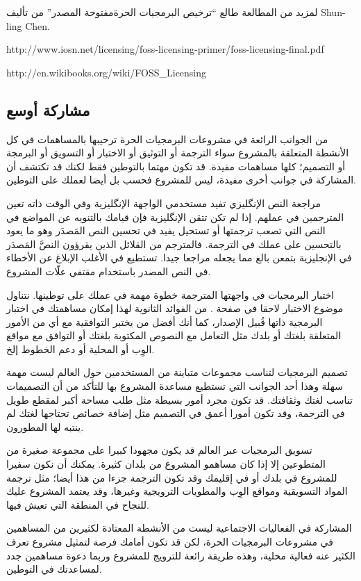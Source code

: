 لمزيد من المطالعة طالع “ترخيص البرمجيات الحرة مفتوحة
المصدر” من تأليف Shun-ling Chen.

http://www.iosn.net/licensing/foss-licensing-primer/foss-licensing-final.pdf

http://en.wikibooks.org/wiki/FOSS\_Licensing

\subsection{مشاركة أوسع}
من الجوانب الرائعة في مشروعات البرمجيات الحرة ترحيبها بالمساهمات في كل
الأنشطة المتعلقة بالمشروع سواء الترجمة أو التوثيق أو الاختبار أو
التسويق أو البرمجة أو التصميم؛ كلها مساهمات مفيدة. قد تكون مهتما
بالتوطين فقط لكنك قد تكتشف أن المشاركة في جوانب أخرى مفيدة، ليس للمشروع
فحسب بل أيضا لعملك على التوطين.

{\md مراجعة النص الإنگليزي} تفيد مستخدمي الواجهة الإنگليزية وفي الوقت
ذاته تعين المترجمين في عملهم. إذا لم تكن تتقن الإنگليزية فإن قيامك
بالتنويه عن المواضع في النص التي تصعب ترجمتها أو تستحيل يفيد في تحسين
النص المَصدَر وهو ما يعود بالتحسين على عملك في الترجمة. فالمترجم من
القلائل الذين يقرؤون النصَّ المَصدَر في الإنجليزية بتمعن بالغ مما يجعله
مراجعا جيدا. تستطيع في الأغلب الإبلاغ عن الأخطاء في النص المصدر
باستخدام مقتفي علّات المشروع.

{\md اختبار البرمجيات} في واجهتها المترجمة خطوة مهمة في عملك على
توطينها. نتناول موضوع الاختبار لاحقا في صفحة
\at[ref:34441726]. من الفوائد الثانوية لهذا إمكان مساهمتك في
اختبار البرمجية ذاتها قُبيل الإصدار، كما أنك أفضل من يختبر التوافقية مع
أي من الأمور المتعلقة بلغتك أو بلدك مثل التعامل مع النصوص المكتوبة
بلغتك أو التوافق مع مواقع الوِب أو المحلية أو دعم الخطوط إلخ.

{\md تصميم البرمجيات} لتناسب مجموعات متباينة من المستخدمين حول العالم
ليست مهمة سهلة وهذا أحد الجوانب التي تستطيع مساعدة المشروع بها للتأكد
من أن التصميمات تناسب لغتك وثقافتك. قد تكون مجرد أمور بسيطة مثل طلب
مساحة أكبر لمقطع طويل في الترجمة، وقد تكون أمورا أعمق في التصميم مثل
إضافة خصائص تحتاجها لغتك لم ينتبه لها المطورون.

{\md تسويق البرمجيات} عبر العالم قد يكون مجهودا كبيرا على مجموعة صغيرة
من المتطوعين إلا إذا كان مساهمو المشروع من بلدان كثيرة. يمكنك أن نكون
سفيرا للمشروع في بلدك أو في إقليمك وقد تكون الترجمة جزءا من هذا أيضا؛
مثل ترجمة المواد التسويقية ومواقع الوِب والمطويات الترويجية وغيرها، وقد
يعتمد المشروع عليك للنجاح في المنطقة التي تعيش فيها.

{\md المشاركة في الفعاليات الاجتماعية} ليست من الأنشطة المعتادة لكثيرين
من المساهمين في مشروعات البرمجيات الحرة، لكن قد تكون أمامك فرصة لتمثيل
مشروع تعرف الكثير عنه فعالية محلية، وهذه طريقة رائعة للترويج للمشروع
وربما دعوة مساهمين جدد لمساعدتك في التوطين.

